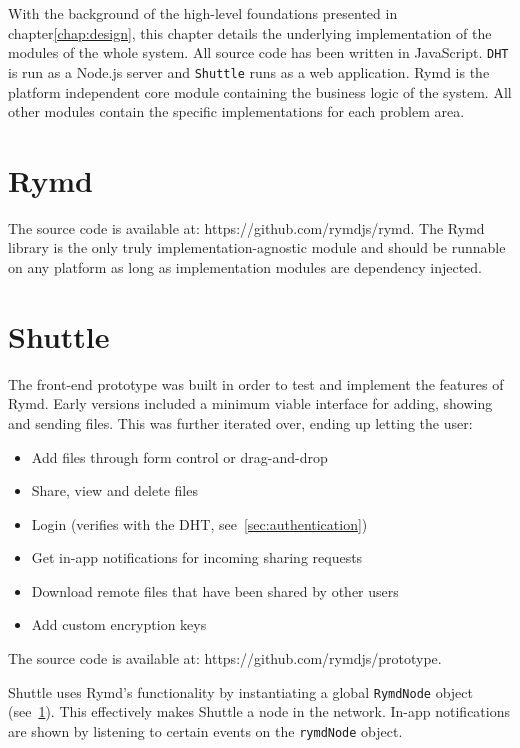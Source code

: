 
With the background of the high-level foundations presented in chapter\ref{chap:design}, this chapter details the underlying implementation of the modules of the whole system. All source code has been written in JavaScript. \texttt{DHT} is run as a Node.js server and \texttt{Shuttle} runs as a web application. Rymd is the platform independent core module containing the business logic of the system. All other modules contain the specific implementations for each problem area.

\section{Rymd}
\label{sec:rymd}


The source code is available at: https://github.com/rymdjs/rymd. The Rymd library is the only truly implementation-agnostic module and should be runnable on any platform as long as implementation modules are dependency injected. 

\section{Shuttle}
\label{sec:shuttle}
The front-end prototype was built in order to test and implement the features of Rymd. Early versions included a minimum viable interface for adding, showing and sending files. This was further iterated over, ending up letting the user:

\begin{itemize}
  \item Add files through form control or drag-and-drop
  \item Share, view and delete files
  \item Login (verifies with the DHT, see~\ref{sec:authentication})
  \item Get in-app notifications for incoming sharing requests
  \item Download remote files that have been shared by other users
  \item Add custom encryption keys
\end{itemize}

The source code is available at: https://github.com/rymdjs/prototype.

Shuttle uses Rymd's functionality by instantiating a global \texttt{RymdNode} object (see~\ref{sec:rymd}). This effectively makes Shuttle a node in the network. In-app notifications are shown by listening to certain events on the \texttt{rymdNode} object.

